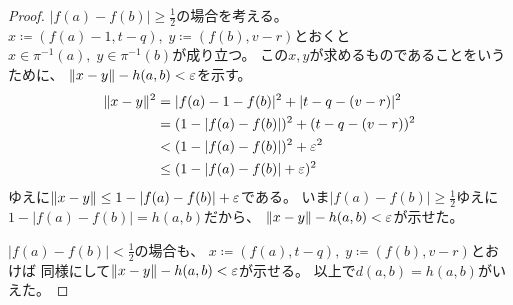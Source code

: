 \documentclass[report]{jlreq}
\begin{document}
\begin{proof}
    $|f(a) - f(b)| \ge \frac{1}{2}$の場合を考える。
    $x \coloneqq (f(a) - 1, t - q), \; y \coloneqq (f(b), v - r)$とおくと
    $x \in \pi^{-1}(a), \; y \in \pi^{-1}(b)$が成り立つ。
    この$x, y$が求めるものであることをいうために、
    $\| x - y \| - h(a, b) < \varepsilon$を示す。
    \begin{alignat}{1}
        \| x - y \|^2
            &= |f(a) - 1 - f(b)|^2 + |t - q - (v - r)|^2 \\
            &= (1 - |f(a) - f(b)|)^2 + (t - q - (v - r))^2 \\
            &< (1 - |f(a) - f(b)|)^2 + \varepsilon^2 \\
            &\le (1 - |f(a) - f(b)| + \varepsilon)^2
    \end{alignat}
    ゆえに$\| x - y \| \le 1 - |f(a) - f(b)| + \varepsilon$である。
    いま$| f(a) - f(b) | \ge \frac{1}{2}$ゆえに
    $1 - | f(a) - f(b) | = h(a, b)$だから、
    $\| x - y \| - h(a, b) < \varepsilon$が示せた。

    $| f(a) - f(b) | < \frac{1}{2}$の場合も、
    $x \coloneqq (f(a), t - q), \; y \coloneqq (f(b), v - r)$とおけば
    同様にして$\| x - y \| - h(a, b) < \varepsilon$が示せる。
    以上で$d(a, b) = h(a, b)$がいえた。


\end{proof}
\end{document}
